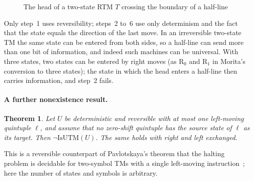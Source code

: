 \documentclass{article}
\newtheorem{theorem}{Theorem}
\theoremstyle{definition}
\theoremstyle{remark}
\newcommand{\rmR}{\mathrm{R}}
\begin{document}
\begin{figure}[tb]
\centering
{}
\caption{The head of a two-state RTM $T$ crossing the boundary of a half-line}
\label{fig:halfline}
\end{figure}
Only step~1 uses reversibility; steps~2 to~6 use only determinism and the fact that the state equals the direction of the last move.
In an irreversible two-state TM the same state can be entered from both sides, so a half-line can send more than one bit of information, and indeed such machines can be universal.
With three states, two states can be entered by right moves (as $\rmR_0$ and $\rmR_1$ in Morita's conversion to three states); the state in which the head enters a half-line then carries information, and step~2 fails.

\paragraph{A further nonexistence result.}
\begin{theorem}
\label{thm:oneL}
Let $U$ be deterministic and reversible with at most one left-moving quintuple $\ell$, and assume that no zero-shift quintuple has the source state of $\ell$ as its target.
Then $\neg\mathrm{IsUTM}(U)$.
The same holds with right and left exchanged.
\end{theorem}
This is a reversible counterpart of Pavlotskaya's theorem that the halting problem is decidable for two-symbol TMs with a single left-moving instruction~\cite{Pavlotskaya73}; here the number of states and symbols is arbitrary.
\end{document}

